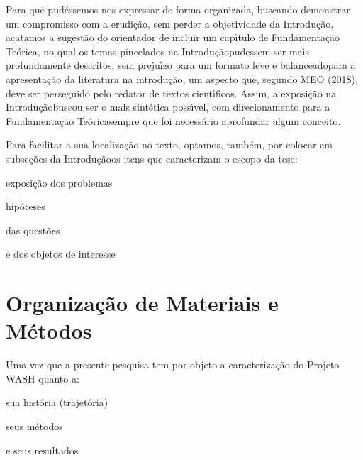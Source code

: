\documentclass[
12pt,		%
openright,	%
twoside,  %
a4paper,			%
chapter=TITLE,		%
english,			%
french,				%
spanish,			%
brazil				%
]{USPSC-classe/USPSC_RedarTex}
\begin{document}
Para que pud\'essemos nos expressar de forma organizada, buscando demonstrar um compromisso com a erudi\c{c}\~ao, sem perder a objetividade da \textquotedbl Introdu\c{c}\~ao\textquotedbl , acatamos a sugest\~ao do orientador de incluir um cap\'{\i}tulo de \textquotedbl Fundamenta\c{c}\~ao Te\'orica\textquotedbl , no qual os temas pincelados na \textquotedbl Introdu\c{c}\~ao\textquotedbl  pudessem ser mais profundamente descritos, sem preju\'{\i}zo para um formato \textquotedbl leve e balanceado\textquotedbl  para a apresenta\c{c}\~ao da literatura na introdu\c{c}\~ao, um aspecto que, segundo  MEO (2018), deve ser perseguido pelo redator de textos cient\'{\i}ficos. Assim, a exposi\c{c}\~ao na \textquotedbl Introdu\c{c}\~ao\textquotedbl  buscou ser o mais sint\'etica poss\'{\i}vel, com direcionamento para a \textquotedbl Fundamenta\c{c}\~ao Te\'orica\textquotedbl  sempre que foi necess\'ario aprofundar algum conceito.








Para facilitar a sua localiza\c{c}\~ao no texto, optamos, tamb\'em, por colocar em subse\c{c}\~oes da \textquotedbl Introdu\c{c}\~ao\textquotedbl  os itens que caracterizam o escopo da tese:









\begin{alineas}
\item exposi\c{c}\~ao dos problemas
\item hip\'oteses
\item das quest\~oes
\item e dos objetos de interesse
\end{alineas}

\section[Organiza\c{c}\~ao de Materiais e M\'etodos]{Organiza\c{c}\~ao de Materiais e M\'etodos}\label{Organiza\c{c}\~ao de Materiais e M\'etodos}
Uma vez que a presente pesquisa tem por objeto a caracteriza\c{c}\~ao do Projeto WASH quanto a:









\begin{alineas}
\item sua hist\'oria (trajet\'oria)
\item seus m\'etodos
\item e seus resultados
\end{alineas}
\end{document}
